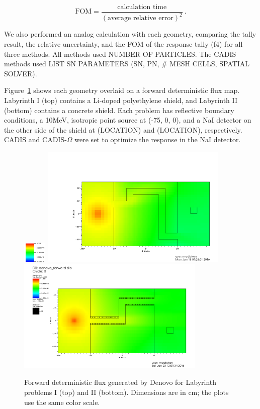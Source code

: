 \documentclass[12pt]{article}
\begin{document}
\[\text{FOM} = \frac{\text{calculation time}}{(\text{average relative error})^2}\:. \]


We also performed an analog calculation with each geometry, comparing  the tally result, the relative uncertainty, and the FOM of the response tally (f4) for all three methods.
All methods used NUMBER OF PARTICLES. 
The CADIS methods used LIST SN PARAMETERS (SN, PN, \# MESH CELLS, SPATIAL SOLVER).

Figure~\ref{fig::fwdflux} shows each geometry overlaid on a forward deterministic flux map. 
Labyrinth I (top) contains a Li-doped polyethylene shield, and Labyrinth II (bottom) contains a concrete shield. 
Each problem has reflective boundary conditions,
 a 10MeV, isotropic point source at (-75, 0, 0), and a NaI detector on the other side of the shield at (LOCATION) and (LOCATION), respectively. 
CADIS and CADIS-$\Omega$ were set to optimize the response in the NaI detector. 
\begin{figure}
  \begin{center}
    \includegraphics[width=0.10\textwidth]{./images/scale.png}
    \includegraphics[width=0.80\textwidth]{./images/forward_flux.png}
    \includegraphics[width=0.80\textwidth]{./images/maze2_forward_group00_adjusted.png}
    \caption[]{\label{fig::fwdflux}Forward deterministic flux generated by Denovo for Labyrinth problems I (top) and II (bottom). Dimensions are in cm; the plots use the same color scale.}
  \end{center}
\end{figure}
\end{document}
